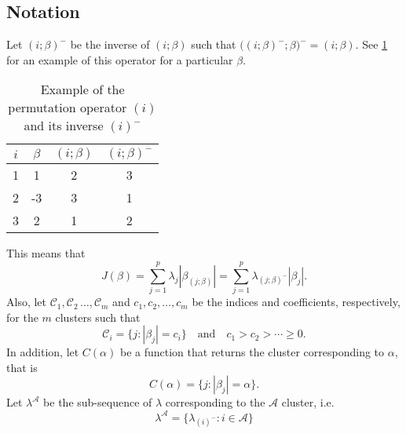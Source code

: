 \subsection{Notation}\label{sec:notation}

Let \((i;\beta)^{-}\) be the inverse of \((i;\beta)\) such that
\(\big((i;\beta)^-;\beta\big)^- = (i;\beta)\). See \cref{tab:permutation-example} for an
example of this operator for a particular \(\beta\).
\begin{table}
  \centering
  \caption{Example of the permutation operator \((i)\) and its inverse
    \((i)^-\)\label{tab:permutation-example}}
  \begin{tabular}{cccc}
    \toprule
    \(i\) & \(\beta\) & \((i; \beta)\) & \((i; \beta)^-\) \\
    \midrule
    1     & 1         & 2              & 3                \\
    2     & -3        & 3              & 1                \\
    3     & 2         & 1              & 2                \\
    \bottomrule
  \end{tabular}
\end{table}
This means that
\[
  J(\beta) = \sum_{j=1}^p \lambda_j |\beta_{(j;\beta)}|
  = \sum_{j=1}^p \lambda_{(j;\beta)^-}|\beta_j|.
\]
Also, let \(\mathcal{C}_1, \mathcal{C}_2\, \dots, \mathcal{C}_m\) and \(c_1,
c_2, \dots, c_m\) be the indices and coefficients, respectively, for the \(m\)
clusters such that
\[
  \mathcal{C}_i = \{j : |\beta_j| = c_i\} \quad \text{and} \quad
  c_1 > c_2 > \cdots \geq 0.
\]
In addition, let \(C(\alpha)\) be a function that returns the
cluster corresponding to \(\alpha\), that is
\[
  C(\alpha) = \{j : |\beta_j| = \alpha\}.
\]
Let \(\lambda^{\mathcal{A}}\) be the sub-sequence of
\(\lambda\) corresponding to the \(\mathcal{A}\) cluster, i.e.
\[
  \lambda^\mathcal{A} = \{\lambda_{(i)^-} : i \in \mathcal{A}\}
\]




